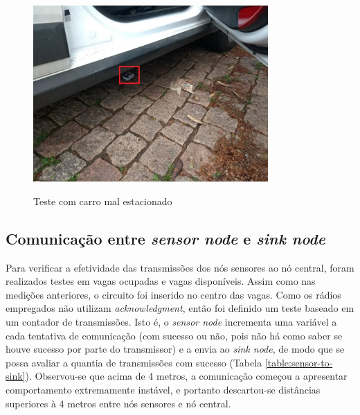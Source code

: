 \documentclass[oneside,openright,12pt]{ufsm_2015} %
\begin{document}
    \begin{figure}[ht]
     	    \caption{\label{exepretex} Teste com carro mal estacionado}
            \centering
            \includegraphics[width=0.8\textwidth]{figuras/mal-estacionado.jpg}
            \vspace{\baselineskip} %
            \label{fig:mal-estacionado}
    \end{figure}
    
    \subsection{Comunicação entre \textit{sensor node} e \textit{sink node}}
    Para verificar a efetividade das transmissões dos nós sensores ao nó central, foram realizados testes em vagas ocupadas e vagas disponíveis. Assim como nas medições anteriores, o circuito foi inserido no centro das vagas. Como os rádios empregados não utilizam \textit{acknowledgment}, então foi definido um teste baseado em um contador de transmissões. Isto é, o \textit{sensor node} incrementa uma variável a cada tentativa de comunicação (com sucesso ou não, pois não há como saber se houve sucesso por parte do transmissor) e a envia ao \textit{sink node}, de modo que se possa avaliar a quantia de transmissões com sucesso (Tabela \ref{table:sensor-to-sink}). Observou-se que acima de 4 metros, a comunicação começou a apresentar comportamento extremamente instável, e portanto descartou-se distâncias superiores à 4 metros entre nós sensores e nó central.
    
\end{document}
